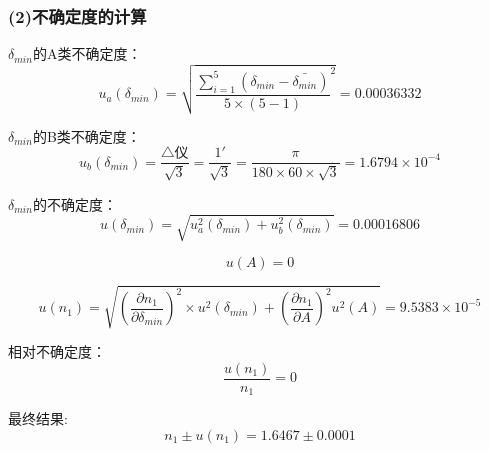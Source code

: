 \documentclass[11pt,a4paper,oneside]{article}
\begin{document}
\subsubsection*{(2)不确定度的计算}
${\delta}_{min}$的A类不确定度：
$$u_a({\delta}_{min}) = \sqrt{\displaystyle\frac{\sum\limits_{i=1}^{5}({\delta}_{min}-\bar{{\delta}_{min}})}{5{\times}(5-1)}^2 } = 0.00036332 $$

${\delta}_{min}$的B类不确定度：
$$u_b({\delta}_{min})=\displaystyle\frac{\bigtriangleup\text{仪}}{\sqrt{3}}
= \frac{1'}{\sqrt{3}} = \frac{\pi}{180\times60\times\sqrt{3}} = 1.6794 \times 10^{-4} $$

${\delta}_{min}$的不确定度：
$$u({\delta}_{min}) = \sqrt{u^2_a({\delta}_{min})+u^2_b({\delta}_{min})} = 0.00016806$$

$$u(A) = 0 $$

$$u(n_1) = \sqrt{(\displaystyle\frac{{\partial}n_1}{{\partial}{\delta}_{min}})^2{\times}u^2({\delta}_{min})+(\displaystyle\frac{{\partial}n_1}{{\partial}A})^2u^2(A)} = 9.5383{\times}10^{-5} $$

相对不确定度：
$$\displaystyle\frac{u(n_1)}{n_1} = 0$$

最终结果:
$${n_1}{\pm}u({n_1}) = 1.6467 {\pm} 0.0001 $$
\end{document}
